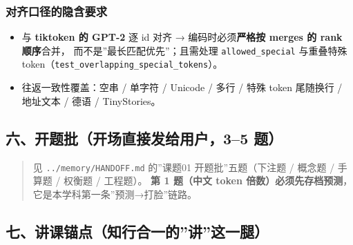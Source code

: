 \documentclass[
  chinese,
  11pt,
]{ctexart}
\providecommand{\tightlist}{%
  \setlength{\itemsep}{0pt}\setlength{\parskip}{0pt}}
\begin{document}
\subsubsection{对齐口径的隐含要求}\label{ux5bf9ux9f50ux53e3ux5f84ux7684ux9690ux542bux8981ux6c42}

\begin{itemize}
\tightlist
\item
  与 \textbf{tiktoken 的 GPT-2} 逐 id 对齐 → 编码时必须\textbf{严格按 merges 的 rank 顺序}合并， 而不是''最长匹配优先''；且需处理 \texttt{allowed\_special} 与重叠特殊 token（\texttt{test\_overlapping\_special\_tokens}）。
\item
  往返一致性覆盖：空串 / 单字符 / Unicode / 多行 / 特殊 token 尾随换行 / 地址文本 / 德语 / TinyStories。
\end{itemize}

\subsection{六、开题批（开场直接发给用户，3--5 题）}\label{ux516dux5f00ux9898ux6279ux5f00ux573aux76f4ux63a5ux53d1ux7ed9ux7528ux623735-ux9898}

\begin{quote}
见 \texttt{../memory/HANDOFF.md} 的''课题01 开题批''五题（下注题 / 概念题 / 手算题 / 权衡题 / 工程题）。 \textbf{第 1 题（中文 token 倍数）必须先存档预测}，它是本学科第一条''预测→打脸''链路。
\end{quote}

\subsection{七、讲课锚点（知行合一的''讲''这一腿）}\label{ux4e03ux8bb2ux8bfeux951aux70b9ux77e5ux884cux5408ux4e00ux7684ux8bb2ux8fd9ux4e00ux817f}
\end{document}
